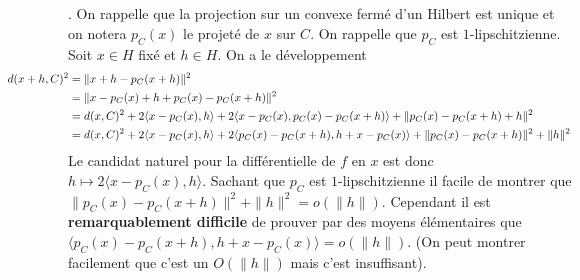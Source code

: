 \documentclass{report}
\begin{document}
\subsection{} \noindent{}\\ 
\\ 
\\
. On rappelle que la projection sur un convexe fermé d'un Hilbert est unique et on notera $p_C(x)$ le projeté de $x$ sur $C$. On rappelle que $p_C$ est $1$-lipschitzienne. \newline
\newline
Soit $x\in H$ fixé et $h\in H$. On a le développement $$\begin{aligned}
\hspace{-2cm}d(x+h,C)^2 &= \|x+h-p_C(x+h)\|^2 \\
&= \|x-p_C(x)+h+p_C(x)-p_C(x+h)\|^2 \\
&= d(x,C)^2+2\langle x-p_C(x),h\rangle + 2\langle x-p_C(x),p_C(x)-p_C(x+h)\rangle + \|p_C(x)-p_C(x+h)+h\|^2\\
&= d(x,C)^2+2\langle x-p_C(x),h\rangle + 2\langle p_C(x)-p_C(x+h),h+x-p_C(x)\rangle + \|p_C(x)-p_C(x+h)\|^2+\|h\|^2
\end{aligned}
$$
Le candidat naturel pour la différentielle de $f$ en $x$ est donc $h\mapsto 2\langle x-p_C(x),h\rangle$.\newline
Sachant que $p_C$ est $1$-lipschitzienne il facile de montrer que $\|p_C(x)-p_C(x+h)\|^2+\|h\|^2 = o(\|h\|)$.\newline \newline
Cependant il est \textbf{remarquablement difficile} de prouver par des moyens élémentaires que $\langle p_C(x)-p_C(x+h),h+x-p_C(x)\rangle = o(\|h\|)$. (On peut montrer facilement que c'est un $O(\|h\|)$ mais c'est insuffisant).\newline 
\end{document}
